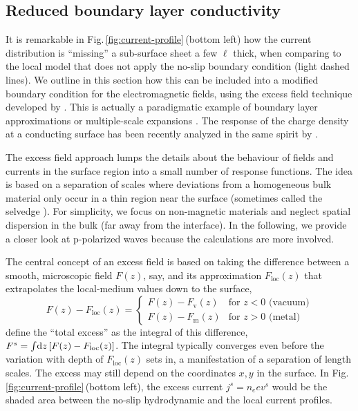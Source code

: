 \documentclass[11pt, oneside]{article}   	%
\newcommand*{\excess}[2][]{{#2}_{#1}^s}
\newcommand{\bulk}[1]{_{\mathrm{#1}}}
\begin{document}
\subsection{Reduced boundary layer conductivity}
\label{s:Bedeaux-Vlieger}

It is remarkable in Fig.\,\ref{fig:current-profile}\,(bottom left) how the current distribution 
is ``missing'' a sub-surface sheet a few $\ell$ thick,
when comparing to the local model that does not
apply the no-slip boundary condition (light dashed lines). We outline in this section
how this can be included into a modified boundary condition for the electromagnetic fields,
using the excess field technique developed by \citet{Bedeaux_2002}. This is actually a
paradigmatic example of boundary layer approximations or multiple-scale expansions
\citep{NayfehBook,BenderOrszagBook}. The response of the charge density at a conducting
surface has been recently analyzed in the same spirit by \citet{AsgerMortensen_2021a}.

The excess field approach lumps the details about the behaviour of fields and currents
in the surface region into a small number of response functions. The idea is based 
on a separation
of scales where deviations from a homogeneous bulk material only occur in a thin region
near the surface (sometimes called the selvedge \citep{Sipe_1980b}). For simplicity, we
focus on non-magnetic materials and neglect spatial dispersion in the bulk (far away from
the interface). In the following, we provide a closer look at p-polarized waves
because the calculations are more involved. 

The central concept of an excess field is based on taking the difference between a smooth,
microscopic
field $F(z)$, say, and its approximation $F\bulk{loc}( z )$ that 
extrapolates the local-medium values down to the surface,
\begin{equation}
F(z) - F\bulk{loc}(z) = \begin{cases}
F(z) - F\bulk{v}(z) & \text{for } z < 0 \text{ (vacuum)}
\\
F(z) - F\bulk{m}(z) & \text{for } z > 0 \text{ (metal)}
\end{cases}
\label{eq:def-excess-field}
\end{equation}
\citet{Bedeaux_2002} define
the ``total excess'' as the integral of this difference,
$\excess{F} = \int\!{\rm d}z\, [ F(z) - F\bulk{loc}(z) ]$.
The integral typically converges even
before the variation with depth of $F\bulk{loc}(z)$ sets in, a manifestation of a
separation of length scales.
The excess may still depend on the coordinates $x, y$ in the surface. 
In Fig.\,\ref{fig:current-profile}\,(bottom left), the excess current $j^s = n_e e v^s$ 
would be the shaded area between the no-slip hydrodynamic and the local current profiles.
\end{document}
